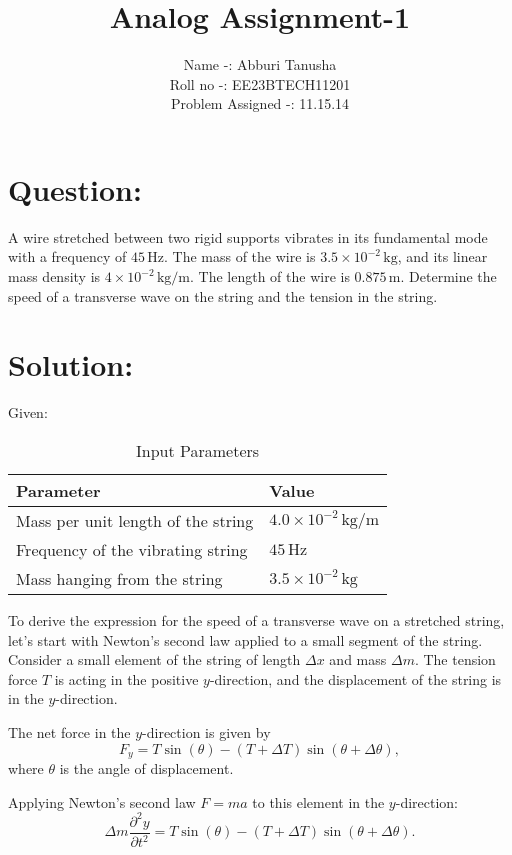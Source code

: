 \documentclass[journal,12pt,onecolumn]{IEEEtran}
\title{Analog Assignment-1}
\author{Name -: Abburi Tanusha\\ Roll no -: EE23BTECH11201\\ Problem Assigned -: 11.15.14}
\begin{document}
\maketitle

\section*{Question:}
A wire stretched between two rigid supports vibrates in its fundamental mode with a frequency of $45 \, \text{Hz}$. The mass of the wire is $3.5 \times 10^{-2} \, \text{kg}$, and its linear mass density is $4 \times 10^{-2} \, \text{kg/m}$. The length of the wire is $0.875 \, \text{m}$. Determine the speed of a transverse wave on the string and the tension in the string.

\section*{Solution:}
Given:
\begin{table}[htb]
\centering
\caption{Input Parameters}
\begin{tabular}{|l|l|}
\hline
\textbf{Parameter} & \textbf{Value} \\
\hline
Mass per unit length of the string & $4.0 \times 10^{-2} \, \text{kg/m}$ \\
\hline
Frequency of the vibrating string & $45 \, \text{Hz}$ \\
\hline
Mass hanging from the string & $3.5 \times 10^{-2} \, \text{kg}$ \\
\hline
\end{tabular}
\end{table}

To derive the expression for the speed of a transverse wave on a stretched string, let's start with Newton's second law applied to a small segment of the string. Consider a small element of the string of length $\Delta x$ and mass $\Delta m$. The tension force $T$ is acting in the positive $y$-direction, and the displacement of the string is in the $y$-direction.

The net force in the $y$-direction is given by 
\begin{equation}\label{eq:force}
    F_y = T \sin(\theta) - (T + \Delta T) \sin(\theta + \Delta \theta),
\end{equation}
where $\theta$ is the angle of displacement.

Applying Newton's second law $F = ma$ to this element in the $y$-direction:
\begin{equation}\label{eq:newton}
    \Delta m \frac{\partial^2y}{\partial t^2} = T \sin(\theta) - (T + \Delta T) \sin(\theta + \Delta \theta).
\end{equation}
\end{document}
